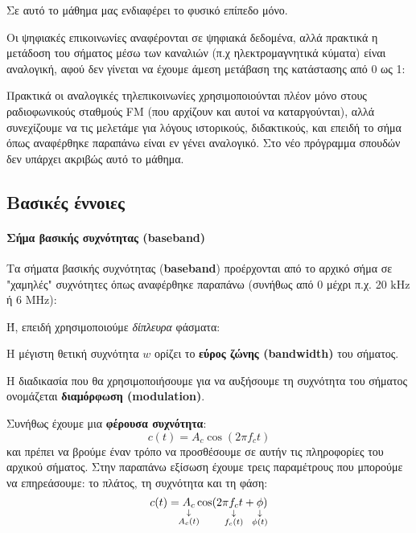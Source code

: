 \documentclass[11pt,a4paper,notitlepage,fleqn]{article}
\begin{document}

Σε αυτό το μάθημα μας ενδιαφέρει το φυσικό επίπεδο μόνο.

Οι ψηφιακές επικοινωνίες αναφέρονται σε ψηφιακά δεδομένα, αλλά πρακτικά η μετάδοση
του σήματος μέσω των καναλιών (π.χ ηλεκτρομαγνητικά κύματα) είναι αναλογική, αφού δεν γίνεται
να έχουμε άμεση μετάβαση της κατάστασης από 0 ως 1:


Πρακτικά οι αναλογικές τηλεπικοινωνίες χρησιμοποιούνται πλέον μόνο στους ραδιοφωνικούς
σταθμούς FM (που αρχίζουν και αυτοί να καταργούνται), αλλά συνεχίζουμε να τις μελετάμε για
λόγους ιστορικούς, διδακτικούς, και επειδή το σήμα όπως αναφέρθηκε παραπάνω είναι εν γένει
αναλογικό. Στο νέο πρόγραμμα σπουδών δεν υπάρχει ακριβώς αυτό το μάθημα.

\subsection{Βασικές έννοιες}
\paragraph{Σήμα βασικής συχνότητας (baseband)}
Τα σήματα βασικής συχνότητας (\textbf{baseband}) προέρχονται από το αρχικό σήμα σε
"χαμηλές" συχνότητες όπως αναφέρθηκε παραπάνω (συνήθως από 0 μέχρι π.χ. 20 \( \mathrm{kHz} \)
ή 6 \( \mathrm{MHz} \)):


Ή, επειδή χρησιμοποιούμε \textit{δίπλευρα} φάσματα:


Η μέγιστη θετική συχνότητα \( w \) ορίζει το \textbf{εύρος ζώνης (bandwidth)} του σήματος.

Η διαδικασία που θα χρησιμοποιήσουμε για να αυξήσουμε τη συχνότητα του σήματος ονομάζεται
\textbf{διαμόρφωση (modulation)}.

Συνήθως έχουμε μια \textbf{φέρουσα συχνότητα}:
\[
c(t) = A_c\cos(2\pi f_c t)
\]
και πρέπει να βρούμε έναν τρόπο να προσθέσουμε σε αυτήν τις πληροφορίες του αρχικού σήματος.
Στην παραπάνω εξίσωση έχουμε τρεις παραμέτρους που μπορούμε να επηρεάσουμε: το πλάτος,
τη συχνότητα και τη φάση:
\[
c(t) =
\underset{\substack{\downarrow\\\mathclap{A_c(t)}}}{A_c}
\cos(2\pi
\underset{\substack{\downarrow\\\mathclap{f_c(t)}}}{f_c}
t
+
\underset{\substack{\downarrow\\\mathclap{\phi(t)}}}{\phi}
)
\]
\end{document}
